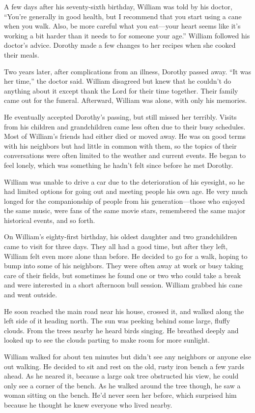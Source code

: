 A few days after his seventy-sixth birthday, William was told by his doctor, “You're generally in good health, but I recommend that you start using a cane when you walk. Also, be more careful what you eat—your heart seems like it's working a bit harder than it needs to for someone your age.” William followed his doctor's advice. Dorothy made a few changes to her recipes when she cooked their meals.

Two years later, after complications from an illness, Dorothy passed away. “It was her time,” the doctor said. William disagreed but knew that he couldn't do anything about it except thank the Lord for their time together. Their family came out for the funeral. Afterward, William was alone, with only his memories.

He eventually accepted Dorothy's passing, but still missed her terribly. Visits from his children and grandchildren came less often due to their busy schedules. Most of William's friends had either died or moved away. He was on good terms with his neighbors but had little in common with them, so the topics of their conversations were often limited to the weather and current events. He began to feel lonely, which was something he hadn't felt since before he met Dorothy.

William was unable to drive a car due to the deterioration of his eyesight, so he had limited options for going out and meeting people his own age. He very much longed for the companionship of people from his generation—those who enjoyed the same music, were fans of the same movie stars, remembered the same major historical events, and so forth.

On William's eighty-first birthday, his oldest daughter and two grandchildren came to visit for three days. They all had a good time, but after they left, William felt even more alone than before. He decided to go for a walk, hoping to bump into some of his neighbors. They were often away at work or busy taking care of their fields, but sometimes he found one or two who could take a break and were interested in a short afternoon bull session. William grabbed his cane and went outside.

He soon reached the main road near his house, crossed it, and walked along the left side of it heading north. The sun was peeking behind some large, fluffy clouds. From the trees nearby he heard birds singing. He breathed deeply and looked up to see the clouds parting to make room for more sunlight.

William walked for about ten minutes but didn't see any neighbors or anyone else out walking. He decided to sit and rest on the old, rusty iron bench a few yards ahead. As he neared it, because a large oak tree obstructed his view, he could only see a corner of the bench. As he walked around the tree though, he saw a woman sitting on the bench. He'd never seen her before, which surprised him because he thought he knew everyone who lived nearby.

